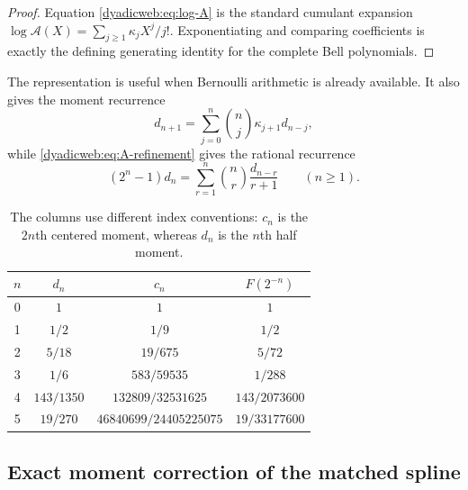 \documentclass[11pt,oneside]{article}
\theoremstyle{definition}
\theoremstyle{remark}
\begin{document}
\begin{proof}
Equation \eqref{dyadicweb:eq:log-A} is the standard cumulant expansion
$\log\mathscr A(X)=\sum_{j\ge1}\kappa_jX^j/j!$.  Exponentiating and comparing coefficients
is exactly the defining generating identity for the complete Bell polynomials.
\end{proof}

The representation is useful when Bernoulli arithmetic is already available.  It also gives
the moment recurrence
\begin{equation}
 d_{n+1}=\sum_{j=0}^{n}\binom nj\kappa_{j+1}d_{n-j},       \label{dyadicweb:eq:cumulant-moment-recurrence}
\end{equation}
while \eqref{dyadicweb:eq:A-refinement} gives the rational recurrence
\begin{equation}
 (2^n-1)d_n
 =\sum_{r=1}^{n}\binom nr\frac{d_{n-r}}{r+1}
 \qquad(n\ge1).                                           \label{dyadicweb:eq:d-recurrence-companion}
\end{equation}

\begin{table}[ht]
\centering
\small
\begin{tabular}{@{}c c c c@{}}
\toprule
$n$ & $d_n$ & $c_n$ & $F(2^{-n})$ \\
\midrule
0 & $1$ & $1$ & $1$ \\
1 & $1/2$ & $1/9$ & $1/2$ \\
2 & $5/18$ & $19/675$ & $5/72$ \\
3 & $1/6$ & $583/59535$ & $1/288$ \\
4 & $143/1350$ & $132809/32531625$ & $143/2073600$ \\
5 & $19/270$ & $46840699/24405225075$ & $19/33177600$ \\
\bottomrule
\end{tabular}
\caption{The columns use different index conventions: $c_n$ is the $2n$th centered moment,
whereas $d_n$ is the $n$th half moment.}
\label{dyadicweb:tab:moments}
\end{table}

\subsection{Exact moment correction of the matched spline}
\label{dyadicweb:subsec:moment-corrected-spline}
\end{document}
